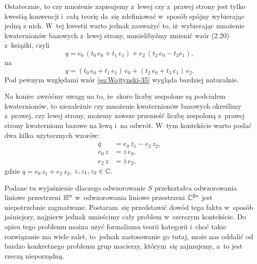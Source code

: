 \documentclass[a4paper,11pt]{article}
\begin{document}
Ostatecznie, to czy mnożenie zapisujemy z~lewej czy z~prawej strony jest
tylko kwestią konwencji i~całą teorię da~się zdefiniować w~sposób spójny
wybierając jedną z nich. W~tej kwestii warto jednak zauważyć to,
iż~wybierając mnożenie kwaternionów bazowych z~lewej strony, musielibyśmy
zmienić wzór (2.20) z~książki, czyli
\begin{equation}
  \label{eq:Wojtynski-35}
  q =
  e_{ 0 } \, ( t_{ 0 } \, e_{ 0 } + t_{ 1 } \, e_{ 1 } )
  + e_{ 2 } \, ( t_{ 2 } \, e_{ 0 } - t_{ 3 } e_{ 1 } ),
\end{equation}
na
\begin{equation}
  \label{eq:Wojtynski-36}
  q =
  ( t_{ 0 } \, e_{ 0 } + t_{ 1 } \, e_{ 1 } ) \, e_{ 0 }
  + ( t_{ 2 } \, e_{ 0 } + t_{ 3 } \, e_{ 1 } ) \, e_{ 2 }.
\end{equation}
Pod pewnym względami wzór \eqref{eq:Wojtynski-35} wygląda bardziej
naturalnie.

Na koniec zwróćmy uwagę na to, że~skoro liczby zespolone są podciałem
kwaternionów, to niezależnie czy mnożenie kwaternionów bazowych określimy
z~prawej, czy lewej strony, możemy zawsze przenieść liczbę zespoloną
z~prawej strony kwaternionu bazowe na lewą i~na odwrót. W~tym kontekście
warto podać dwa kilka użytecznych wzorów:
\begin{subequations}
  \begin{align}
    \label{eq:Wojtynski-37-A}
    \bar{q} &= e_{ 0 } \, \bar{z}_{ 1 } - e_{ 2 } \, z_{ 2 }, \\
    \label{eq:Wojtynski-37-B}
    e_{ 0 } \, z &= z \, e_{ 0 }, \\
    \label{eq:Wojtynski-37-C}
    e_{ 2 } \, z &= \bar{z} \, e_{ 2 },
  \end{align}
\end{subequations}
gdzie $q = e_{ 0 } \, z_{ 1 } + e_{ 2 } \, z_{ 2 }$, $z, z_{ 1 }, z_{ 2 } \in \mathbb{C}$.

\vspace{\spaceFour}





 Podane tu wyjaśnienie dlaczego odwzorowanie $S$ przekształca
odwzorowania liniowe przestrzeni $\mathbb{H}^{ n }$ w~odwzorowania liniowe
przestrzeni $\mathbb{C}^{ 2n }$ jest niepotrzebnie zagmatwane. Postaram~się
przedstawić dowód tego faktu w~sposób jaśniejszy, najpierw jednak
umieścimy cały problem w~szerszym kontekście. Do opisu tego problemu
można użyć formalizmu teorii kategorii i~choć takie rozwiązanie ma wiele
zalet, to~jednak zastosowanie go tutaj, może nas oddalić od bardzo
konkretnego problemu grup macierzy, którym~się zajmujemy, a~to jest rzeczą
nieporządną.
\end{document}
